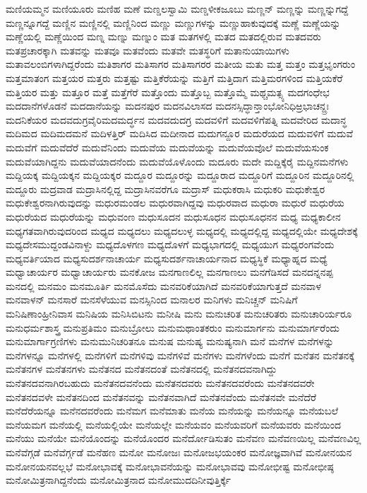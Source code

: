 {ಮಣಿಯಮ್ಮನ
ಮಣಿಯೂರು
ಮಣಿಹ
ಮಣೆ
ಮಣ್ಡಲಸ್ವಾಮಿ
ಮಣ್ಡಳೀಕಜೂಬು
ಮಣ್ಣನ್
ಮಣ್ಣನ್ನು
ಮಣ್ಣನ್ನುಗದ್ದೆ
ಮಣ್ಣನ್ನೂಗದ್ದೆ
ಮಣ್ಣಿನ
ಮಣ್ಣಿನಲ್ಲಿ
ಮಣ್ಣಿನಿಂದ
ಮಣ್ಣು
ಮಣ್ಣುಗಳನ್ನು
ಮಣ್ಣುಹಾಕುವುದಕ್ಕೆ
ಮಣ್ಣೆ
ಮಣ್ಣೆಯನ್ನು
ಮಣ್ಣೆಯಲ್ಲಿ
ಮಣ್ಣೆಯಿಂದ
ಮಣ್ನ
ಮಣ್ನು
ಮಣ್ನುಂ
ಮತ
ಮತಗಳಲ್ಲಿ
ಮತದ
ಮತದಲ್ಲಿರುವ
ಮತದವರು
ಮತಪ್ರಚಾರಕ್ಕಾಗಿ
ಮತವನ್ನು
ಮತವೂ
ಮತವೆಂದು
ಮತವೇ
ಮತಸ್ಥರಿಗೆ
ಮತಾನುಯಾಯಿಗಳು
ಮತಾವಲಂಬಿಗಳಾಗಿದ್ದರೆಂದು
ಮತಿಶಾಗರ
ಮತಿಸಾಗರ
ಮತಿಸಾಗರರ
ಮತೀಯ
ಮತು
ಮತ್ತ
ಮತ್ತಂ
ಮತ್ತಭೃಂಗರುಂ
ಮತ್ತಮಾತಂಗ
ಮತ್ತಯರ
ಮತ್ತರು
ಮತ್ತಷ್ಟು
ಮತ್ತಿಕೆರೆಯನ್ನು
ಮತ್ತಿಗೆ
ಮತ್ತಿದಾಗ
ಮತ್ತಿಮರಗಳಿಂದ
ಮತ್ತಿಯಕೆರೆ
ಮತ್ತಿಯರ
ಮತ್ತು
ಮತ್ತೂರ
ಮತ್ತೆ
ಮತ್ತೆಗೆರೆ
ಮತ್ತೊಂದು
ಮತ್ತೊಬ್ಬ
ಮತ್ತೊಮ್ಮೆ
ಮಥ್ಚಮತ್ಸ್ಯ
ಮದಗಂಧೇಭ
ಮದದಾನೆಗಳೊಡನೆ
ಮದದಾನೆಯನ್ನು
ಮದನಪುರ
ಮದನವಿಲಾಸದ
ಮದನಸ್ಸಿದ್ಧಾನ್ತಾಂಭೋನಿಧಿಱ್ರಭಾಚನ್ದ್ರಃ
ಮದನಿಕೆಯರ
ಮದವದುಗ್ರವೈರಿಮದಮರ್ದ್ಧನ
ಮದವದುದಗ್ರ
ಮದವಳಿಗೆ
ಮದವಳಿಗೆಪತ್ನಿ
ಮದವೇರಿದ
ಮದಾನ್ಧ
ಮದಿಮದ
ಮದಿಮದಮನೆ
ಮದಿಳತ್ತಿರ್
ಮದಿಸಿದ
ಮದೀನಾದ
ಮದುಗನ್ದೂರ
ಮದುರೆಯದ
ಮದುವಳಿಗೆ
ಮದುವೆ
ಮದುವೆಗೆ
ಮದುವೆದೆರೆ
ಮದುವೆನಿಂದು
ಮದುವೆಯ
ಮದುವೆಯನ್ನು
ಮದುವೆಯವೊಲೆ
ಮದುವೆಯಸುಂಕ
ಮದುವೆಯಾಗಿದ್ದನು
ಮದುವೆಯಾದನೆಂದು
ಮದುವೆಯೊಳೊಂದು
ಮದೂರು
ಮದೇ
ಮದ್ದಿಕ್ಕೆರೈ
ಮದ್ದಿನಮನೆಗಳು
ಮದ್ದಿಯಕ್ಕ
ಮದ್ದಿಯಕ್ಕನ
ಮದ್ದಿಯಕ್ಕರ
ಮದ್ದೂರ
ಮದ್ದೂರನ್ನು
ಮದ್ದೂರಾದ
ಮದ್ದೂರಿಗೆ
ಮದ್ದೂರಿನ
ಮದ್ದೂರಿನಲ್ಲಿ
ಮದ್ದೂರು
ಮದ್ರವಾಡ
ಮದ್ರಾಸಿನಲ್ಲಿದ್ದ
ಮದ್ರಾಸಿನವರೆಗೂ
ಮದ್ರಾಸ್
ಮಧುಕರಾಸಿ
ಮಧುಕರಿ
ಮಧುಕೇಶ್ವರ
ಮಧುಕೇಶ್ವರನಾಗಿರುವುದನ್ನು
ಮಧುರಮಂಡಲ
ಮಧುರವಾಗಿದ್ದವು
ಮಧುರವಾದ
ಮಧುರಾ
ಮಧುರೆ
ಮಧುರೆಯ
ಮಧುರೆಯದ
ಮಧುರೆಯನ್ನು
ಮಧುವಂಣ
ಮಧುಸೂದನ
ಮಧುಸೂಧನ
ಮಧುಸೂಧನನ
ಮಧ್ಯ
ಮಧ್ಯಕಾಲೀನ
ಮಧ್ಯಗತವಾಗಿರುವುದರಿಂದ
ಮಧ್ಯದ
ಮಧ್ಯದಲು
ಮಧ್ಯದಲುಳ್ಳ
ಮಧ್ಯದಲ್ಲಿ
ಮಧ್ಯದಲ್ಲಿದ್ದ
ಮಧ್ಯದಲ್ಲಿಯೇ
ಮಧ್ಯದೇಶಕ್ಕೆ
ಮಧ್ಯದೇಸಮುದ್ದಂಡವಿನಾಳ್ದು
ಮಧ್ಯದೊಳಗಣ
ಮಧ್ಯದೊಳಗೆ
ಮಧ್ಯಭಾಗದಲ್ಲಿ
ಮಧ್ಯಯುಗ
ಮಧ್ಯರಂಗವೆಂದು
ಮಧ್ಯವರ್ತಿಯಾದ
ಮಧ್ಯಸುದರ್ಶನಾಚಾರ್ಯ
ಮಧ್ಯಸುದರ್ಶನಾಚಾರ್ಯನಾದ
ಮಧ್ಯಸ್ಥಿಕೆ
ಮಧ್ಯಾಹ್ನದ
ಮಧ್ಯೆ
ಮಧ್ವಾಚಾರ್ಯರ
ಮಧ್ವಾಚಾರ್ಯರು
ಮನಕೋಜ
ಮನಗಾಣಲಿಲ್ಲ
ಮನಗಾಣಲು
ಮನಗೆಡಿಸದೆ
ಮನದನ್ನನಪ್ಪ
ಮನದಲ್ಲಿ
ಮನಮಂ
ಮನಮೂರ್ತಿ
ಮನಮೊಸೆದು
ಮನವರಿಕೆಯಾಗಿದೆ
ಮನವರಿಕೆಯಾಗುತ್ತದೆ
ಮನವಾಳ
ಮನವಾಳನ್
ಮನಸಾರೆ
ಮನಸೆಳೆಯುವ
ಮನಸ್ಸಿನಿಂದ
ಮನಾಲರ
ಮನಿಗಳು
ಮನಿಚ್ಚನ್
ಮನಿಷಿಗೆ
ಮನಿಷಿಣಾಂಹ್ರೀನಿವಾಸ
ಮನಿಷಿಯ
ಮನಿಸಿಬಿಟನು
ಮನೀಷಿ
ಮನು
ಮನುಚರಿತ
ಮನುಚರಿತರು
ಮನುಚಾರಿರ್ಯರೂ
ಮನುಧರ್ಮಶಾಸ್ತ್ರ
ಮನುಪ್ರತಿಮಂ
ಮನುಬ್ರೋಲು
ಮನುಮಥಾಂತಕರುಂ
ಮನುಮಾರ್ಗನು
ಮನುಮಾರ್ಗರೆಂದು
ಮನುಮಾರ್ಗಾಗ್ರಣಿಗಳು
ಮನುಮುನಿಚರಿತನೂ
ಮನುಷ
ಮನುಷ್ಯ
ಮನುಷ್ಯನಾಗಿ
ಮನೆ
ಮನೆಗಳ
ಮನೆಗಳನ್ನು
ಮನೆಗಳನ್ನೂ
ಮನೆಗಳಲ್ಲಿ
ಮನೆಗಳಿಗೆ
ಮನೆಗಳಿವು
ಮನೆಗಳಿವೆ
ಮನೆಗಳು
ಮನೆಗಳೆಂದು
ಮನೆಗೆ
ಮನೆತನ
ಮನೆತನಕ್ಕೆ
ಮನೆತನಗಳ
ಮನೆತನಗಳು
ಮನೆತನದ
ಮನೆತನದಂತೆ
ಮನೆತನದಲ್ಲಿ
ಮನೆತನದವನಾಗಿದ್ದು
ಮನೆತನದವನಾಗಿರಬಹುದು
ಮನೆತನದವನೆಂದು
ಮನೆತನದವರು
ಮನೆತನದವರೆಂದು
ಮನೆತನದವರೇ
ಮನೆತನದವಳೇ
ಮನೆತನದಿಂದ
ಮನೆತನವನ್ನು
ಮನೆತನವಾಗಿದೆ
ಮನೆತನವೆಂದು
ಮನೆತನವೇ
ಮನೆದೆರೆ
ಮನೆದೆರೆಯನ್ನೂ
ಮನೆನದವರೆಂದು
ಮನೆಮಗ
ಮನೆಮಾತು
ಮನೆಯ
ಮನೆಯನ್ನು
ಮನೆಯನ್ನೂ
ಮನೆಯಬಲೆ
ಮನೆಯಮಗ
ಮನೆಯಲ್ಲಿ
ಮನೆಯಲ್ಲಿಯೇ
ಮನೆಯಲ್ಲೇ
ಮನೆಯವಂ
ಮನೆಯವರಿಗೆ
ಮನೆಯವರು
ಮನೆಯಿಂದ
ಮನೆಯು
ಮನೆಯೇ
ಮನೆಯೊಂದನ್ನು
ಮನೆಯೊಂದರ
ಮನೆರ್ದೋಡಿಸುತಂ
ಮನೆವಣ
ಮನೆವಣಯಿಲ್ಲ
ಮನೆವಣವಿಲ್ಲ
ಮನೆವೆಗ್ಗಡೆ
ಮನೆವೆರ್ಗ್ಗಡೆ
ಮನೆಹಣ
ಮನೋ
ಮನೋಜಃ
ಮನೋಜಭಯಂಕರ
ಮನೋಜ್ಞವಾಗಿವೆ
ಮನೋನಯನ
ಮನೋನಯನವಲ್ಲಭೆ
ಮನೋಭಾವಕ್ಕೆ
ಮನೋಭಾವನೆಯನ್ನು
ಮನೋಭಾವವು
ಮನೋಭೀಷ್ಟ
ಮನೋಭೀಷ್ಠ
ಮನೋಮಿತ್ರನಾಗಿದ್ದನೆಂದು
ಮನೋಮಿತ್ರನಾದ
ಮನೋಮುದದಿನೀವುತ್ತಿರ್ಕ್ಕೆ
}
